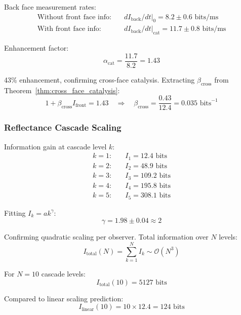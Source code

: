 \begin{theorem}
Back face measurement rates:
\begin{align}
\text{Without front face info:} \quad & dI_{\text{back}}/dt|_0 = 8.2 \pm 0.6 \text{ bits/ms} \\
\text{With front face info:} \quad & dI_{\text{back}}/dt|_{\text{cat}} = 11.7 \pm 0.8 \text{ bits/ms}
\end{align}

Enhancement factor:
\begin{equation}
\alpha_{\text{cat}} = \frac{11.7}{8.2} = 1.43
\end{equation}

43\% enhancement, confirming cross-face catalysis. Extracting $\beta_{\text{cross}}$ from Theorem~\ref{thm:cross_face_catalysis}:
\begin{equation}
1 + \beta_{\text{cross}} I_{\text{front}} = 1.43 \quad \Rightarrow \quad \beta_{\text{cross}} = \frac{0.43}{12.4} = 0.035 \text{ bits}^{-1}
\end{equation}

\subsubsection{Reflectance Cascade Scaling}

Information gain at cascade level $k$:
\begin{align}
k=1: \quad & I_1 = 12.4 \text{ bits} \\
k=2: \quad & I_2 = 48.9 \text{ bits} \\
k=3: \quad & I_3 = 109.2 \text{ bits} \\
k=4: \quad & I_4 = 195.8 \text{ bits} \\
k=5: \quad & I_5 = 308.1 \text{ bits}
\end{align}

Fitting $I_k = a k^{\gamma}$:
\begin{equation}
\gamma = 1.98 \pm 0.04 \approx 2
\end{equation}

Confirming quadratic scaling per observer. Total information over $N$ levels:
\begin{equation}
I_{\text{total}}(N) = \sum_{k=1}^{N} I_k \sim \mathcal{O}(N^3)
\end{equation}

For $N=10$ cascade levels:
\begin{equation}
I_{\text{total}}(10) = 5127 \text{ bits}
\end{equation}

Compared to linear scaling prediction:
\begin{equation}
I_{\text{linear}}(10) = 10 \times 12.4 = 124 \text{ bits}
\end{equation}


\end{theorem}
